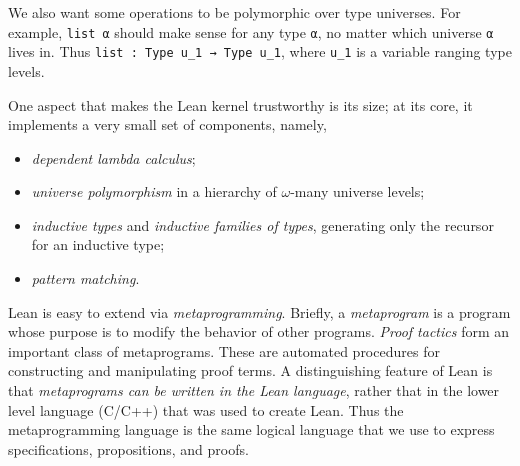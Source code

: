 \documentclass[11pt]{amsart}  %
\begin{document}
We also want some operations to be polymorphic over type universes. For example,  \lstinline{list α} should make sense for any type  \lstinline{α}, no matter which universe  \lstinline{α} lives in. Thus \lstinline{list : Type u_1 → Type u_1}, where \lstinline{u_1} is a variable ranging type levels. 

One aspect that makes the Lean kernel trustworthy is its size; at its core, it implements a very small set of components, namely,
\begin{itemize}
  \item \emph{dependent lambda calculus};
  \item \emph{universe polymorphism} in a hierarchy of $\omega$-many universe levels;
  \item \emph{inductive types} and \emph{inductive families of types}, generating only the recursor for an inductive type;
  \item \emph{pattern matching}.
\end{itemize}


Lean is easy to extend via \emph{metaprogramming}. Briefly, a \emph{metaprogram} is
a program whose purpose is to modify the behavior of other programs. \emph{Proof tactics} form an important class of metaprograms. These are automated procedures for constructing and manipulating proof terms. A distinguishing feature of Lean is that \emph{metaprograms can be written in the Lean language}, rather that in the lower level language (C/C++) that was used to create Lean. Thus the metaprogramming language is the same logical language that we use to express specifications, propositions, and proofs.


\end{document}
